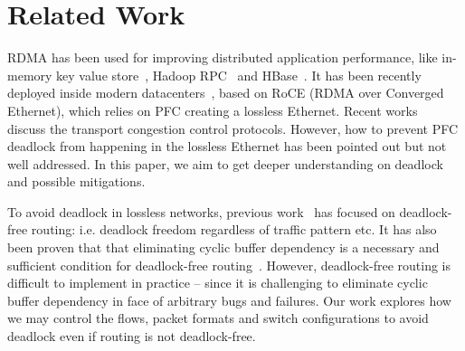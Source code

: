 \secspacelarge
\section{Related Work}
\secspace

 RDMA has been used for improving distributed application performance,
like in-memory key value store~\cite{mitchell13atc, farm, kalia14sigcomm}, 
Hadoop RPC~\cite{hadooprdma} and HBase~\cite{hbaserdma}.
It has been recently deployed inside modern datacenters~\cite{timely,dcqcn,rdmascale}, based on
RoCE (RDMA over Converged Ethernet), which relies on PFC creating a lossless Ethernet.
Recent works~\cite{timely,dcqcn} discuss the transport congestion control protocols. However,
how to prevent PFC deadlock from happening in the lossless Ethernet has been pointed out 
but not well addressed. In this paper, we aim to get deeper understanding on deadlock 
and possible mitigations.

 To avoid deadlock in lossless networks, previous
work~\cite{tcpbolt,karol2003prevention,lash,sancho2004,wu2003fault} has focused
on deadlock-free routing: i.e. deadlock freedom regardless of traffic pattern
etc. It has also been proven that that eliminating cyclic buffer dependency is a
necessary and sufficient condition for deadlock-free
routing~\cite{deadlockfree}. However, deadlock-free routing is difficult to
implement in practice -- since it is challenging to eliminate cyclic buffer
dependency in face of arbitrary bugs and failures. Our work explores how we may
control the flows, packet formats and switch configurations to avoid deadlock
even if routing is not deadlock-free.







